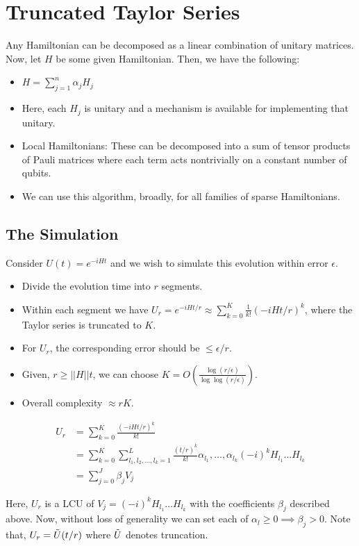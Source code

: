 \documentclass[
10pt, %
a4paper, %
oneside, %
headinclude,footinclude, %
BCOR5mm, %
]{scrartcl}
\begin{document}
\section{Truncated Taylor Series}
Any Hamiltonian can be decomposed as a linear combination of unitary matrices. Now, let $H$ be some given Hamiltonian. Then, we have the following:
\begin{itemize}
    \item $H = \sum_{j = 1}^n \alpha_j H_j$
    \item Here, each $H_j$ is unitary and a mechanism is available for implementing that unitary.
    \item Local Hamiltonians: These can be decomposed into a sum of tensor products of Pauli matrices where each term acts nontrivially on a constant number of qubits.
    \item We can use this algorithm, broadly, for all families of sparse Hamiltonians.
\end{itemize}

\subsection{The Simulation}
Consider $U(t) = e^{-iHt}$ and we wish to simulate this evolution within error $\epsilon$.
\begin{itemize}
    \item Divide the evolution time into $r$ segments.
    \item Within each segment we have $U_r = e^{-iHt/r} \approx \sum_{k = 0}^{K} \frac{1}{k!} (-iHt/r)^k$, where the Taylor series is truncated to $K$.
    \item For $U_r$, the corresponding error should be $\leq \epsilon/r$.
    \item Given, $r \geq ||H||t$, we can choose $K = O(\frac{\log(r/\epsilon)}{\log\log{(r/\epsilon)}})$.
    \item Overall complexity $\approx rK$.
\end{itemize}
\begin{align*}
U_r &= \sum_{k = 0}^K \frac{(-iHt/r)^k}{k!}\\ &= \sum_{k = 0}^K \sum_{l_1, l_2,\ldots, l_k = 1}^L \frac{(t/r)^k}{k!} \alpha_l_1,\ldots, \alpha_l_k (-i)^k H_l_1 \ldots H_l_k\\ &= \sum_{j = 0}^{J} \beta_j V_j
\end{align*}

Here, $U_r$ is a LCU of $V_j = (-i)^k H_l_1 \ldots H_l_k$ with the coefficients $\beta_j$ described above. Now, without loss of generality we can set each of $\alpha_l \geq 0 \implies \beta_j > 0$. Note that, $U_r = \Tilde{U}(t/r)$ where $\Tilde{U}$ denotes truncation.
\end{document}
